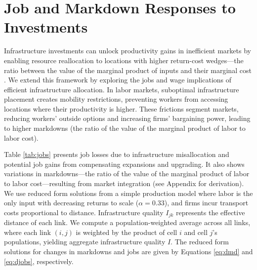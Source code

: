 \documentclass[a4paper]{article}
\begin{document}





\section{Job and Markdown Responses to Investments}

Infrastructure investments can unlock productivity gains in inefficient markets by enabling resource reallocation to locations with higher return-cost wedges---the ratio between the value of the marginal product of inputs and their marginal cost \citep{hornbeck2024growth}. We extend this framework by exploring the jobs and wage implications of efficient infrastructure allocation. In labor markets, suboptimal infrastructure placement creates mobility restrictions, preventing workers from accessing locations where their productivity is higher. These frictions segment markets, reducing workers' outside options and increasing firms' bargaining power, leading to higher markdowns (the ratio of the value of the marginal product of labor to labor cost). \newline 

Table \ref{tab:jobs} presents job losses due to infrastructure misallocation and potential job gains from compensating expansions and upgrading. It also shows variations in markdowns---the ratio of the value of the marginal product of labor to labor cost---resulting from market integration (see Appendix for derivation). We use reduced form solutions from a simple production model where labor is the only input with decreasing returns to scale ($\alpha = 0.33$), and firms incur transport costs proportional to distance. Infrastructure quality $I_{jk}$ represents the effective distance of each link. We compute a population-weighted average across all links, where each link $(i,j)$ is weighted by the product of cell $i$ and cell $j$'s populations, yielding aggregate infrastructure quality $I$. The reduced form solutions for changes in markdowns and jobs are given by Equations \ref{eq:dmd} and \ref{eq:djobs}, respectively.
\end{document}
